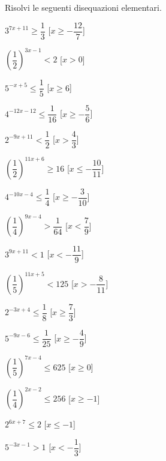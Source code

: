 \begin{esercizio}\label{ese:}
 Risolvi le seguenti disequazioni elementari.
 \begin{multicols}{2}
 \begin{enumeratea}
  \item  \(3^{7 x +11} \geqslant \dfrac{1}{3}\)
   \hfill [\(x \geqslant -\dfrac{12}{7}\)]
  \item  \(\left(\dfrac{1}{2}\right)^{3 x -1} < 2\)
   \hfill [\(x > 0\)]
  \item  \(5^{- x +5} \leqslant \dfrac{1}{5}\)
   \hfill [\(x \geqslant 6\)]
  \item  \(4^{-12 x -12} \leqslant \dfrac{1}{16}\)
   \hfill [\(x \geqslant -\dfrac{5}{6}\)]
  \item  \(2^{-9 x +11} < \dfrac{1}{2}\)
   \hfill [\(x > \dfrac{4}{3}\)]
  \item  \(\left(\dfrac{1}{2}\right)^{11 x +6} \geqslant 16\)
   \hfill [\(x \leqslant -\dfrac{10}{11}\)]
  \item  \(4^{-10 x -4} \leqslant \dfrac{1}{4}\)
   \hfill [\(x \geqslant -\dfrac{3}{10}\)]
  \item  \(\left(\dfrac{1}{4}\right)^{9 x -4} > \dfrac{1}{64}\)
   \hfill [\(x < \dfrac{7}{9}\)]
  \item  \(3^{9 x +11} < 1\)
   \hfill [\(x < -\dfrac{11}{9}\)]
  \item  \(\left(\dfrac{1}{5}\right)^{11 x +5} < 125\)
   \hfill [\(x > -\dfrac{8}{11}\)]
  \item  \(2^{-3 x +4} \leqslant \dfrac{1}{8}\)
   \hfill [\(x \geqslant \dfrac{7}{3}\)]
  \item  \(5^{-9 x -6} \leqslant \dfrac{1}{25}\)
   \hfill [\(x \geqslant -\dfrac{4}{9}\)]
  \item  \(\left(\dfrac{1}{5}\right)^{7 x -4} \leqslant 625\)
   \hfill [\(x \geqslant 0\)]
  \item  \(\left(\dfrac{1}{4}\right)^{2 x -2} \leqslant 256\)
   \hfill [\(x \geqslant -1\)]
  \item  \(2^{6 x +7} \leqslant 2\)
   \hfill [\(x \leqslant -1\)]
  \item  \(5^{-3 x -1} > 1\)
   \hfill [\(x < -\dfrac{1}{3}\)]
 \end{enumeratea}
 \end{multicols}
\end{esercizio}



